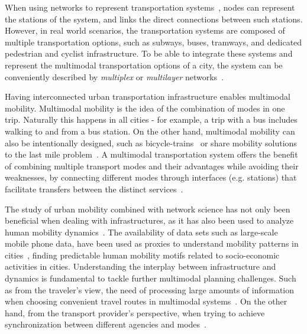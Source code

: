 When using networks to represent transportation systems~\cite{lin2013complex}, nodes can represent the stations of the system, and links the direct connections between such stations. However, in real world scenarios, the transportation systems are composed of multiple transportation options, such as subways, buses, tramways, and dedicated pedestrian and cyclist infrastructure. To be able to integrate these systems and represent the multimodal transportation options of a city, the system can be conveniently described by \textit{multiplex} or \textit{multilayer} networks~\cite{dedomenico2013mathematical,kivela2014multilayer,boccaletti2014structure,battiston2014structural}.

Having interconnected urban transportation infrastructure enables multimodal mobility. Multimodal mobility is the idea of the combination of modes in one trip. Naturally this happens in all cities - for example, a trip with a bus includes walking to and from a bus station. On the other hand, multimodal mobility can also be intentionally designed, such as bicycle-trains~\cite{geurs2016multi} or share mobility solutions to the last mile problem~\cite{shaheen2016mobility}. A multimodal transportation system offers the benefit of combining multiple transport modes and their advantages while avoiding their weaknesses, by connecting different modes through interfaces (e.g. stations) that facilitate transfers between the distinct services~\cite{vannes2002design}.

The study of urban mobility combined with network science has not only been beneficial when dealing with infrastructures, as it has also been used to analyze human mobility dynamics~\cite{barbosa2018human}. The availability of data sets such as large-scale mobile phone data, have been used as proxies to understand mobility patterns in cities~\cite{gonzalez2008understanding}, finding predictable human mobility motifs related to socio-economic activities in cities. Understanding the interplay between infrastructure and dynamics is fundamental to tackle further multimodal planning challenges. Such as from the traveler's view, the need of processing large amounts of information when choosing convenient travel routes in multimodal systems~\cite{gallotti2016limits}. On the other hand, from the transport provider's perspective, when trying to achieve synchronization between different agencies and modes~\cite{barthelemy2016structure}.

